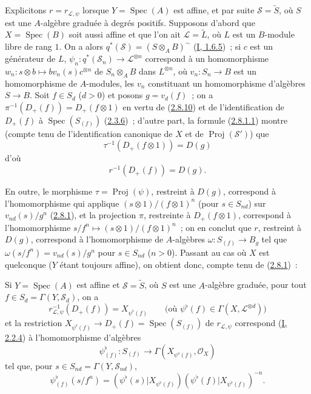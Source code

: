 \begin{env}[3.7.2]
\label{II.3.7.2-fr}
Explicitons $r=r_{\mathcal{L},\psi}$ lorsque $Y=\operatorname{Spec}(A)$ est
affine, et par suite $\mathcal{S}=\widetilde{S}$, où $S$ est une $A$-algèbre
graduée à degrés positifs. Supposons d'abord que $X=\operatorname{Spec}(B)$
soit aussi affine et que l'on ait $\mathcal{L}=\widetilde{L}$, où $L$ est un
$B$-module libre de rang $1$. On a alors
$q^*(\mathcal{S})=(S\otimes_AB)^{\sim}$
(\hyperref[I.1.6.5-fr]{I, 1.6.5})~; si $c$ est un générateur de $L$,
$\psi_n:q^*(\mathcal{S}_n)\to\mathcal{L}^{\otimes n}$ correspond à un
homomorphisme
$w_n:s\otimes b\mapsto bv_n(s)c^{\otimes n}$ de $S_n\otimes_AB$ dans
$L^{\otimes n}$, où $v_n:S_n\to B$ est un homomorphisme de $A$-modules, les
$v_n$ constituant un homomorphisme d'algèbres $S\to B$. Soit $f\in S_d$
($d>0$) et posons $g=v_d(f)$~; on a
$\pi^{-1}(D_+(f))=D_+(f\otimes1)$ en vertu de
(\hyperref[II.2.8.10-fr]{2.8.10}) et de l'identification de $D_+(f)$ à
$\operatorname{Spec}(S_{(f)})$ (\hyperref[II.2.3.6-fr]{2.3.6})~; d'autre
part, la formule (\hyperref[II.2.8.1.1-fr]{2.8.1.1}) montre (compte tenu de
l'identification canonique de $X$ et de $\operatorname{Proj}(\mathcal{S}')$)
que
\[
  \tau^{-1}(D_+(f\otimes1))=D(g)
\]
d'où
\[
\label{II.3.7.2.1-fr}
  r^{-1}(D_+(f))=D(g).
\tag{3.7.2.1}
\]

En outre, le morphisme $\tau=\operatorname{Proj}(\psi)$, restreint à $D(g)$,
correspond à l'homomorphisme qui applique
$(s\otimes1)/(f\otimes1)^n$ (pour $s\in S_{nd}$) sur
$v_{nd}(s)/g^n$ (\hyperref[II.2.8.1-fr]{2.8.1}), et la projection $\pi$,
restreinte à $D_+(f\otimes1)$, correspond à l'homomorphisme
$s/f^n\mapsto(s\otimes1)/(f\otimes1)^n$~; on en conclut que $r$, restreint à
$D(g)$, correspond à l'homomorphisme de $A$-algèbres
$\omega:S_{(f)}\to B_g$ tel que $\omega(s/f^n)=v_{nd}(s)/g^n$ pour
$s\in S_{nd}$ ($n>0$). Passant au cas où $X$ est quelconque ($Y$ étant
toujours affine), on obtient donc, compte tenu de
(\hyperref[II.2.8.1-fr]{2.8.1})~:
\end{env}

\begin{proposition}[3.7.3]
\label{II.3.7.3-fr}
Si $Y=\operatorname{Spec}(A)$ est affine et $\mathcal{S}=\widetilde{S}$, où
$S$ est une $A$-algèbre graduée, pour tout
$f\in S_d=\Gamma(Y,\mathcal{S}_d)$, on a
\[
\label{II.3.7.3.1-fr}
  r_{\mathcal{L},\psi}^{-1}(D_+(f))=X_{\psi^\flat(f)}
  \qquad\bigl(\text{où }\psi^\flat(f)\in
  \Gamma(X,\mathcal{L}^{\otimes d})\bigr)
\tag{3.7.3.1}
\]
et la restriction $X_{\psi^\flat(f)}\to D_+(f)=\operatorname{Spec}(S_{(f)})$
de $r_{\mathcal{L},\psi}$ correspond
(\hyperref[I.2.2.4-fr]{I, 2.2.4}) à l'homomorphisme d'algèbres
\[
\label{II.3.7.3.2-fr}
  \psi_{(f)}^\flat:S_{(f)}\longrightarrow
  \Gamma(X_{\psi^\flat(f)},\mathcal{O}_X)
\tag{3.7.3.2}
\]
tel que, pour $s\in S_{nd}=\Gamma(Y,\mathcal{S}_{nd})$,
\[
\label{II.3.7.3.3-fr}
  \psi_{(f)}^\flat(s/f^n)
  =(\psi^\flat(s)|X_{\psi^\flat(f)})
   (\psi^\flat(f)|X_{\psi^\flat(f)})^{-n}.
\tag{3.7.3.3}
\]
\end{proposition}

